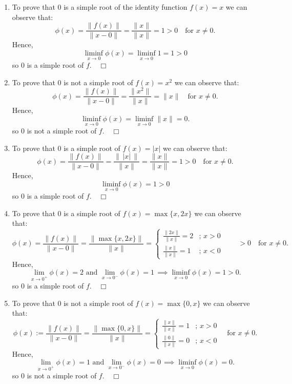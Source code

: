 \documentclass[]{article}
\begin{document}
\begin{enumerate}
    \item To prove that $0$ is a simple root of the identity function $f(x)=x$ we can observe that:
    \[
\displaystyle \phi(x)=\frac{\|f(x)\|}{\|x-0\|}
= \frac{\|x\|}{\|x\|}=1 > 0 \quad \text{for } x\neq 0.
\]
Hence,
\[
\displaystyle \liminf_{x\to 0}\phi(x)=\liminf_{x\to 0} 1 = 1>0
\]
so $0$ is a simple root of $f. \quad \Box$

\item To prove that $0$ is not a simple root of $f(x) = x^2$ we can observe that:
    \[
\displaystyle \phi(x)=\frac{\|f(x)\|}{\|x-0\|}
= \frac{\|x^2\|}{\|x\|}=\|x\| \quad \text{for } x\neq 0.
\]
Hence,
\[
\displaystyle \liminf_{x\to 0}\phi(x)=\liminf_{x\to 0} \|x\| =0.
\]
so $0$ is not a simple root of $f. \quad \Box$

\item To prove that $0$ is a simple root of $f(x) = |x|$ we can observe that:
    \[
\displaystyle \phi(x)=\frac{\|f(x)\|}{\|x-0\|}
= \frac{\|\,|x|\,\|}{\|x\|}=\frac{\|x\|}{\|x\|}=1 > 0 \quad \text{for } x\neq 0.
\]
Hence,
\[
\displaystyle \liminf_{x\to 0}\phi(x)=1>0
\]
so $0$ is a simple root of $f. \quad \Box$


\item To prove that $0$ is a simple root of $f(x) = \max\{x,2x\}$ we can observe that:
    \[
\displaystyle \phi(x)=\frac{\|f(x)\|}{\|x-0\|}
= \frac{\|\max\{x,2x\}\|}{\|x\|}=
\begin{cases}
\frac{\|2x\|}{\|x\|}=2 &;\, x>0\\[4pt]
\frac{\|x\|}{\|x\|}=1 & ;\,x<0
\end{cases}
\qquad > 0 \quad \text{for } x\neq 0.
\]
Hence,
\[
\displaystyle \lim_{x\to 0^{+}}\phi(x)=2 \text{ and } \lim_{x\to 0^{-}}\phi(x)=1\, \implies \displaystyle \liminf_{x\to 0}\phi(x) =1 >0.
\]
so $0$ is a simple root of $f. \quad \Box$
\item To prove that $0$ is not a simple root of $f(x)= \max\{0,x\}$ we can observe that:
    \[
\displaystyle \phi(x):=\frac{\|f(x)\|}{\|x-0\|}
= \frac{\|\max\{0,x\}\|}{\|x\|}=
\begin{cases}
\frac{\|x\|}{\|x\|}=1 &;\, x>0\\[4pt]
\frac{\|0\|}{\|x\|}=0 &;\, x<0
\end{cases} \quad \text{for } x\neq 0.
\]
Hence,
\[
\lim_{x\to 0^{+}}\phi(x)=1 \text{ and } \lim_{x\to 0^{-}}\phi(x)=0\, \implies \displaystyle \liminf_{x\to 0}\phi(x) =0.
\]
so $0$ is not a simple root of $f. \quad \Box$

\end{enumerate}
\end{document}
